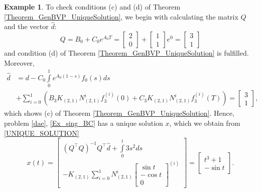 \documentclass[preprint,12pt]{elsarticle}
\numberwithin{equation}{section}
\theoremstyle{definition}
\newtheorem{example}[theorem]{Example}
\begin{document}
\begin{example}
To check conditions (c) and (d) of Theorem \ref{Theorem_GenBVP_UniqueSolution}, we begin with calculating the matrix $Q$ and the vector $\widehat{d}$:
\begin{equation*}
    Q=B_0+C_0 e^{A_0 T}=\begin{bmatrix}
        2\\0
    \end{bmatrix}+\begin{bmatrix}
        1\\1
    \end{bmatrix}e^{0}=\begin{bmatrix}
        3\\1
    \end{bmatrix}
\end{equation*}
and condition (d) of Theorem \ref{Theorem_GenBVP_UniqueSolution} is fulfilled.
Moreover,
\begin{equation*}\begin{aligned}
    \widehat{d}&=d-C_0\int\limits_0^1 e^{A_0(1-s)}f_0(s)ds\\&+\sum\limits_{i=0}^1\left(B_3K_{(2,1)}N_{(2,1)}^i f_3^{(i)}(0)+C_3K_{(2,1)}N_{(2,1)}^i f_3^{(i)}(T)\right)=\begin{bmatrix}
        3\\1
    \end{bmatrix},
\end{aligned}
   \end{equation*}
 which shows (c) of Theorem \ref{Theorem_GenBVP_UniqueSolution}.
 Hence, problem \eqref{dae}, \eqref{Ex_sing_BC} has a unique solution $x$, which we obtain from \eqref{UNIQUE_SOLUTION}
\begin{equation*}
    x(t)=\begin{bmatrix}
        (Q^\top Q)^{-1}Q^\top\widehat{d}+\int\limits_0^t 3s^2 ds\\
        -K_{(2,1)}\sum\limits_{i=0}^1 N_{(2,1)}^i \begin{bmatrix}
            \sin t\\-\cos t\\0
        \end{bmatrix}^{(i)}
         \end{bmatrix}=\begin{bmatrix}
             t^3+1\\-\sin t
         \end{bmatrix}.
\end{equation*}

\end{example}
\end{document}
